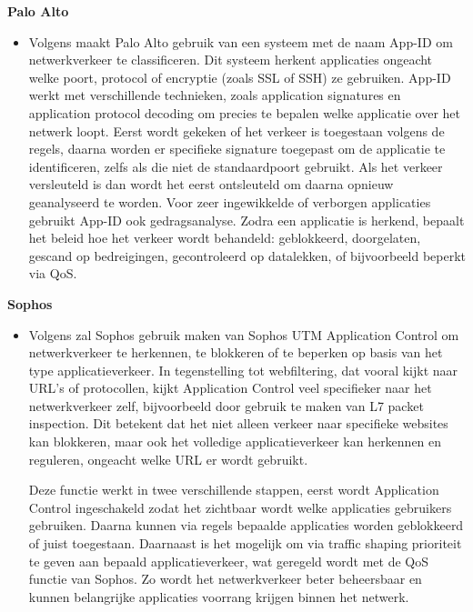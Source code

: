 \textbf{Palo Alto}
\begin{itemize}[label=\textbullet]
    \item Volgens \textcite{PaloAltoAPP2025} maakt Palo Alto gebruik van een systeem met de naam App-ID om netwerkverkeer te classificeren. Dit systeem herkent applicaties ongeacht welke poort, protocol of encryptie (zoals SSL of SSH) ze gebruiken. App-ID werkt met verschillende technieken, zoals application signatures en application protocol decoding om precies te bepalen welke applicatie over het netwerk loopt. Eerst wordt gekeken of het verkeer is toegestaan volgens de regels, daarna worden er specifieke signature toegepast om de applicatie te identificeren, zelfs als die niet de standaardpoort gebruikt. Als het verkeer versleuteld is dan wordt het eerst ontsleuteld om daarna opnieuw geanalyseerd te worden. Voor zeer ingewikkelde of verborgen applicaties gebruikt App-ID ook gedragsanalyse. Zodra een applicatie is herkend, bepaalt het beleid hoe het verkeer wordt behandeld: geblokkeerd, doorgelaten, gescand op bedreigingen, gecontroleerd op datalekken, of bijvoorbeeld beperkt via QoS.
\end{itemize}

\textbf{Sophos}
\begin{itemize}[label=\textbullet]
    \item Volgens \textcite{SophosTS2025} zal Sophos gebruik maken van Sophos UTM Application Control om netwerkverkeer te herkennen, te blokkeren of te beperken op basis van het type applicatieverkeer. In tegenstelling tot webfiltering, dat vooral kijkt naar URL’s of protocollen, kijkt Application Control veel specifieker naar het netwerkverkeer zelf, bijvoorbeeld door gebruik te maken van L7 packet inspection. Dit betekent dat het niet alleen verkeer naar specifieke websites kan blokkeren, maar ook het volledige applicatieverkeer kan herkennen en reguleren, ongeacht welke URL er wordt gebruikt.
    
    Deze functie werkt in twee verschillende stappen, eerst wordt Application Control ingeschakeld zodat het zichtbaar wordt welke applicaties gebruikers gebruiken. Daarna kunnen via regels bepaalde applicaties worden geblokkeerd of juist toegestaan. Daarnaast is het mogelijk om via traffic shaping prioriteit te geven aan bepaald applicatieverkeer, wat geregeld wordt met de QoS functie van Sophos. Zo wordt het netwerkverkeer beter beheersbaar en kunnen belangrijke applicaties voorrang krijgen binnen het netwerk.
\end{itemize}






